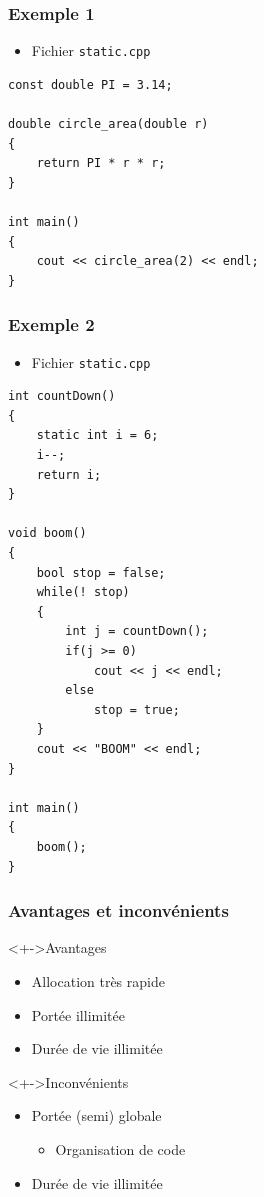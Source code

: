\begin{frame}[containsverbatim]
\frametitle{Exemple 1}
\begin{itemize}
\item Fichier \texttt{static.cpp}
\end{itemize}
\begin{lstlisting}
const double PI = 3.14;

double circle_area(double r)
{
	return PI * r * r;
}

int main()
{
	cout << circle_area(2) << endl;
}
\end{lstlisting}
\end{frame}

\begin{frame}[containsverbatim]
\frametitle{Exemple 2}
\begin{itemize}
\item Fichier \texttt{static.cpp}
\end{itemize}
\begin{lstlisting}
int countDown()
{
	static int i = 6;	
	i--;
	return i;
}

void boom()
{
	bool stop = false;
	while(! stop)
	{
		int j = countDown();
		if(j >= 0)
			cout << j << endl;
		else
			stop = true;
	}
	cout << "BOOM" << endl;		
}

int main()
{
	boom();
}
\end{lstlisting}
\end{frame}

\begin{frame}
\frametitle{Avantages et inconvénients}
\begin{block}<+->{Avantages}
	\begin{itemize}[<+->]
	\item Allocation très rapide
	\item Portée illimitée
	\item Durée de vie illimitée
	\end{itemize}
\end{block}
\begin{alertblock}<+->{Inconvénients}
	\begin{itemize}[<+->]
	\item Portée (semi) globale
		\begin{itemize}
		\item Organisation de code
		\end{itemize}
	\item Durée de vie illimitée
	\end{itemize}
\end{alertblock}
\end{frame}

